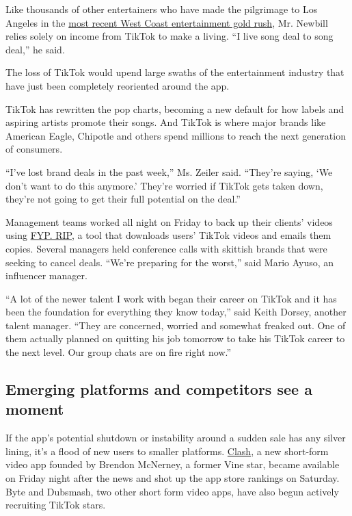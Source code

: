 Like thousands of other entertainers who have made the pilgrimage to Los
Angeles in the
\href{https://www.nytimes3xbfgragh.onion/2020/01/03/style/hype-house-los-angeles-tik-tok.html}{most
recent West Coast entertainment gold rush}, Mr. Newbill relies solely on
income from TikTok to make a living. ``I live song deal to song deal,''
he said.

The loss of TikTok would upend large swaths of the entertainment
industry that have just been completely reoriented around the app.

TikTok has rewritten the pop charts, becoming a new default for how
labels and aspiring artists promote their songs. And TikTok is where
major brands like American Eagle, Chipotle and others spend millions to
reach the next generation of consumers.

``I've lost brand deals in the past week,'' Ms. Zeiler said. ``They're
saying, `We don't want to do this anymore.' They're worried if TikTok
gets taken down, they're not going to get their full potential on the
deal.''

Management teams worked all night on Friday to back up their clients'
videos using \href{https://www.fyp.rip/}{FYP. RIP,} a tool that
downloads users' TikTok videos and emails them copies. Several managers
held conference calls with skittish brands that were seeking to cancel
deals. ``We're preparing for the worst,'' said Mario Ayuso, an
influencer manager.

``A lot of the newer talent I work with began their career on TikTok and
it has been the foundation for everything they know today,'' said Keith
Dorsey, another talent manager. ``They are concerned, worried and
somewhat freaked out. One of them actually planned on quitting his job
tomorrow to take his TikTok career to the next level. Our group chats
are on fire right now.''

\hypertarget{emerging-platforms-and-competitors-see-a-moment}{%
\subsection{Emerging platforms and competitors see a
moment}\label{emerging-platforms-and-competitors-see-a-moment}}

If the app's potential shutdown or instability around a sudden sale has
any silver lining, it's a flood of new users to smaller platforms.
\href{https://create.clashapp.co/appstore}{Clash}, a new short-form
video app founded by Brendon McNerney, a former Vine star, became
available on Friday night after the news and shot up the app store
rankings on Saturday. Byte and Dubsmash, two other short form video
apps, have also begun actively recruiting TikTok stars.

